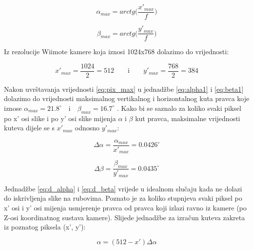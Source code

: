\documentclass[times, utf8, diplomski]{fer}
\begin{document}
\begin{equation}
\alpha_{max} = arctg\bigg(\frac{x'_{max}}{f}\bigg)
\label{eq:alpha1}
\end{equation}

\begin{equation}
\beta_{max} = arctg\bigg(\frac{y'_{max}}{f}\bigg)
\label{eq:beta1}
\end{equation}

\vspace{5mm}

Iz rezolucije Wiimote kamere koja iznosi 1024x768 dolazimo do vrijednosti:

\begin{equation}
x'_{max} = \frac{1024}{2} = 512 \qquad\text{i}\qquad y'_{max} = \frac{768}{2} = 384
\label{eq:pix_max}
\end{equation}

\vspace{5mm}

Nakon uvrštavanja vrijednosti \ref{eq:pix_max} u jednadžbe \ref{eq:alpha1} i \ref{eq:beta1} dolazimo do vrijednosti maksimalnog vertikalnog i horizontalnog kuta pravca koje iznose $\alpha_{max} = 21.8^{\circ} \quad\text{i}\quad \beta_{max} = 16.7^{\circ}$ . Kako bi se saznalo za koliko svaki piksel po x' osi slike i po y' osi slike mijenja $\alpha$ i $\beta$ kut pravca, maksimalne vrijednosti kuteva dijele se s $x'_{max}$ odnosno $y'_{max}$:

\begin{equation}
\Delta\alpha = \frac{\alpha_{max}}{x'_{max}} = 0.0426^{\circ}
\label{eq:d_alpha}
\end{equation}  

\begin{equation}
\Delta\beta = \frac{\beta_{max}}{y'_{max}} = 0.0435^{\circ}
\label{eq:d_beta}
\end{equation}

\vspace{5mm}

Jednadžbe \ref{eq:d_alpha} i \ref{eq:d_beta} vrijede u idealnom slučaju kada ne dolazi do iskrivljenja slike na rubovima. Poznato je za koliko stupnjeva svaki piksel po x' osi i y' osi mijenja usmjerenje pravca od pravca koji izlazi ravno iz kamere (po Z-osi koordinatnog sustava kamere). Slijede jednadžbe za izračun kuteva zakreta iz poznatog piksela (x', y'):

\begin{equation}
\alpha = (512 - x')\Delta\alpha
\label{eq:alpha}
\end{equation}
\end{document}
